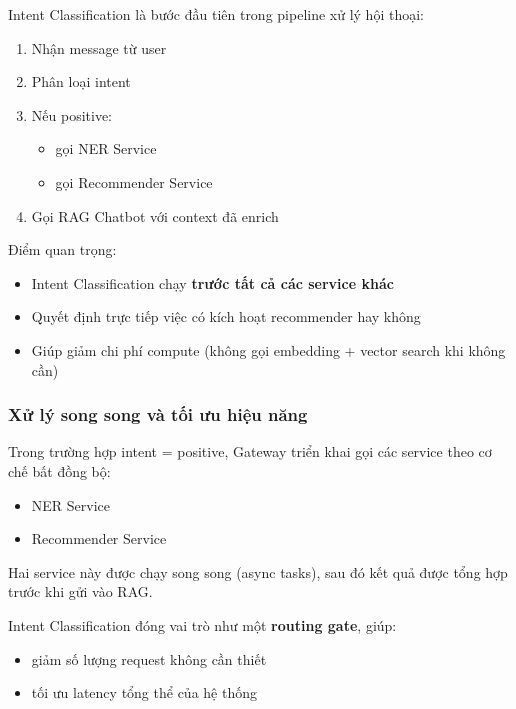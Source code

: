 Intent Classification là bước đầu tiên trong pipeline xử lý hội thoại:

\begin{enumerate}
    \item Nhận message từ user
    \item Phân loại intent
    \item Nếu positive:
    \begin{itemize}
        \item gọi NER Service
        \item gọi Recommender Service
    \end{itemize}
    \item Gọi RAG Chatbot với context đã enrich
\end{enumerate}

Điểm quan trọng:

\begin{itemize}
    \item Intent Classification chạy \textbf{trước tất cả các service khác}
    \item Quyết định trực tiếp việc có kích hoạt recommender hay không
    \item Giúp giảm chi phí compute (không gọi embedding + vector search khi không cần)
\end{itemize}

\subsubsection{Xử lý song song và tối ưu hiệu năng}

Trong trường hợp intent = positive, Gateway triển khai gọi các service theo cơ chế bất đồng bộ:

\begin{itemize}
    \item NER Service
    \item Recommender Service
\end{itemize}

Hai service này được chạy song song (async tasks), sau đó kết quả được tổng hợp trước khi gửi vào RAG.

Intent Classification đóng vai trò như một \textbf{routing gate}, giúp:

\begin{itemize}
    \item giảm số lượng request không cần thiết
    \item tối ưu latency tổng thể của hệ thống
\end{itemize}


